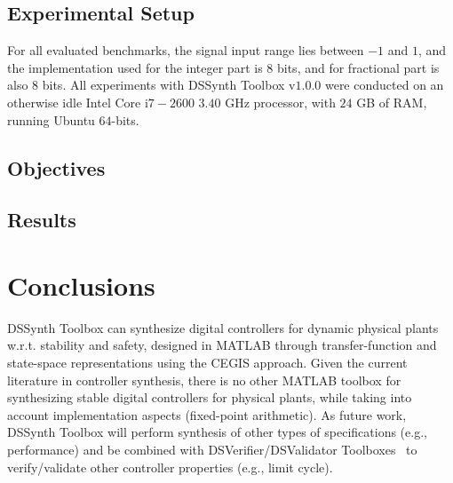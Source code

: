 \documentclass[10pt,conference]{IEEEtran}
\newcommand\tool{{DSSynth Toolbox}\xspace}
\begin{document}
\subsection{Experimental Setup}
\label{experimental-setup}

For all evaluated benchmarks, the signal input range lies between $-1$ and $1$, and the implementation used for the integer part is $8$ bits, and for fractional part is also $8$ bits.
%
All experiments with \tool v$1$.$0$.$0$  were conducted on an otherwise idle Intel Core i$7-2600$ 
$3.40$ GHz processor, with $24$ GB of RAM, running Ubuntu $64$-bits.

\subsection{Objectives}


\subsection{Results}


\section{Conclusions}

\tool can synthesize digital controllers for dynamic physical plants 
w.r.t. stability and safety, designed in MATLAB through transfer-function 
and state-space representations using the CEGIS approach.
%
Given the current literature in controller synthesis, there is no other MATLAB toolbox 
for synthesizing stable digital controllers for physical plants, while taking into account implementation 
aspects (fixed-point arithmetic). 
%
As future work, \tool will perform synthesis of other types of specifications (e.g., performance) 
and be combined with DSVerifier/DSValidator Toolboxes~\cite{issta2017,dsvalidator} to verify/validate
 other controller properties (e.g., limit cycle). 


 
\end{document}
